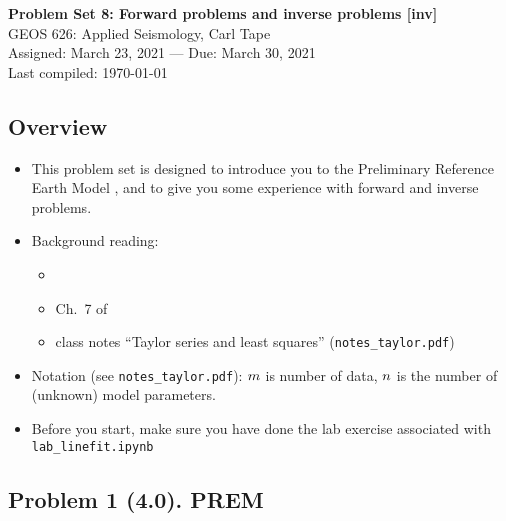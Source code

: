 \documentclass[11pt,titlepage,fleqn]{article}
\begin{document}

\begin{spacing}{1.2}
\centering
{\large \bf Problem Set 8: Forward problems and inverse problems [inv]} \\
GEOS 626: Applied Seismology, Carl Tape \\
Assigned: March 23, 2021 --- Due: March 30, 2021 \\
Last compiled: \today
\end{spacing}


\subsection*{Overview}

\begin{itemize}
\item This problem set is designed to introduce you to the Preliminary Reference Earth Model \citep{PREM}, and to give you some experience with forward and inverse problems.

\item Background reading:
%
\begin{itemize}
\item \citet{PREM}
\item Ch.~7 of \citet{SteinWysession}
\item class notes ``Taylor series and least squares'' (\verb+notes_taylor.pdf+)
\end{itemize}


\item Notation (see \verb+notes_taylor.pdf+): $m$ is number of data, $n$ is the number of (unknown) model parameters.

\item Before you start, make sure you have done the lab exercise associated with \verb+lab_linefit.ipynb+

\end{itemize}


\subsection*{Problem 1 (4.0). PREM}
\end{document}
